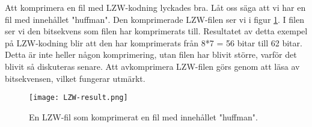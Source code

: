 Att komprimera en fil med LZW-kodning lyckades bra. Låt oss säga att vi har en fil med innehållet "huffman". Den komprimerade LZW-filen ser vi i figur \ref{fig:lzwresults}. I filen ser vi den bitsekvens som filen har komprimerats till. Resultatet av detta exempel på LZW-kodning blir att den har komprimerats från 8*7 = 56 bitar till 62 bitar. Detta är inte heller någon komprimering, utan filen har blivit större, varför det blivit så diskuteras senare. Att avkomprimera LZW-filen görs genom att läsa av bitsekvensen, vilket fungerar utmärkt.

\begin{figure}
  \texttt{[image: LZW-result.png]}
  \caption{En LZW-fil som komprimerat en fil med innehållet "huffman".}
  \label{fig:lzwresults}
\end{figure}


